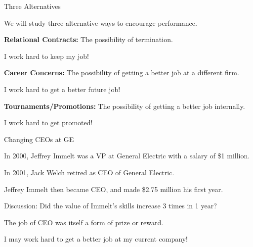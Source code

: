 \documentclass[aspectratio=169,usenames,dvipsnames]{beamer}
\newenvironment{wideitemize}{\itemize\addtolength{\itemsep}{10pt}}{\enditemize}
\begin{document}
\begin{frame}{Three Alternatives}

\begin{wideitemize}
    \item We will study three alternative ways to encourage performance.
    \item \textbf{Relational Contracts:} The possibility of termination.
    \begin{wideitemize}
        \item I work hard to keep my job!
    \end{wideitemize}
    \item \textbf{Career Concerns:} The possibility of getting a better job at a different firm.
    \begin{wideitemize}
        \item I work hard to get a better future job!
    \end{wideitemize}
    \item \textbf{Tournaments/Promotions:} The possibility of getting a better job internally.
    \begin{wideitemize}
        \item I work hard to get promoted!
    \end{wideitemize}
\end{wideitemize}
    
\end{frame}


\begin{frame}{Changing CEOs at GE}

\begin{wideitemize}
    \item In 2000, Jeffrey Immelt was a VP at General Electric with  a salary of \$1 million.
    \item In 2001, Jack Welch retired as CEO of General Electric.
    \item Jeffrey Immelt then became CEO, and made \$2.75 million his first year.
    \item Discussion: Did the value of Immelt's skills increase 3 times in 1 year?\pause
    \item The job of CEO was itself a form of prize or reward.
\end{wideitemize}
    
\end{frame}


\begin{frame}
\centering
    \huge I may work hard to get a better job at my current company!

\end{frame}
\end{document}
